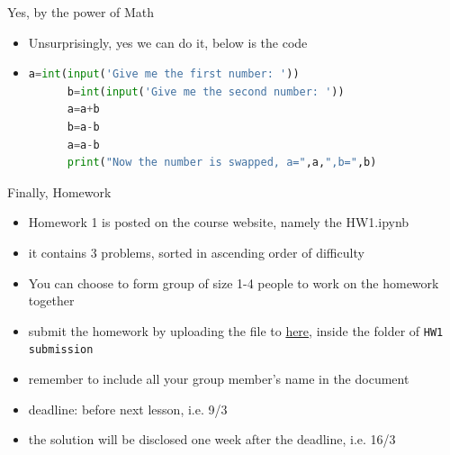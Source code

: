 \documentclass[10pt,xcolor={table,dvipsnames},t]{beamer}
\begin{document}
\begin{frame}[fragile]{Yes, by the power of Math}
  \begin{itemize}
    \item Unsurprisingly, yes we can do it, below is the code
    \item \begin{lstlisting}[language=python]
      a=int(input('Give me the first number: '))
      b=int(input('Give me the second number: '))
      a=a+b
      b=a-b
      a=a-b
      print("Now the number is swapped, a=",a,",b=",b)\end{lstlisting}
  \end{itemize}
\end{frame}

\begin{frame}[fragile]{Finally, Homework}
  \begin{itemize}
    \item Homework 1 is posted on the course website, namely the HW1.ipynb
    \item it contains 3 problems, sorted in ascending order of difficulty
    \item You can choose to form group of size 1-4 people to work on the homework together
    \item submit the homework by uploading the file to \href{https://drive.google.com/drive/folders/1TqSFSwu8-KdzIHZcQWB7PjgqPJen4dsO?usp=sharing}{here}, inside the folder of \texttt{HW1 submission}
    \item remember to include all your group member's name in the document
    \item deadline: before next lesson, i.e. 9/3
    \item the solution will be disclosed one week after the deadline, i.e. 16/3
  \end{itemize}
\end{frame}

\end{document}
